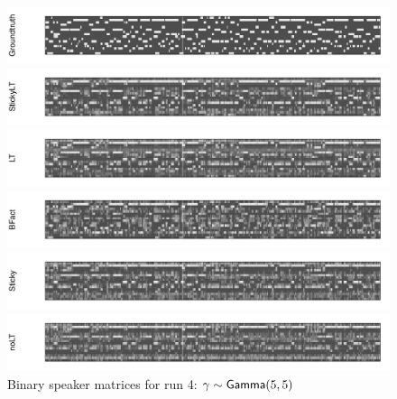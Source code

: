 \begin{figure}[tb]
\begin{center}
  \centerline{\includegraphics[width = \textwidth, height = 0.2\textwidth]{fig/cocktail/synth_s16_m12/hyper_gamma/h10.0_nocs_cp0/a5b5/groundtruth.pdf}}
  \centerline{\includegraphics[width = \textwidth, height = 0.2\textwidth]{fig/cocktail/synth_s16_m12/hyper_gamma/h10.0_nocs_cp0/a5b5/StickyLT_hdp_hmm_w0_agamma5_bgamma5/binary_state.pdf}}
  \centerline{\includegraphics[width = \textwidth, height = 0.2\textwidth]{fig/cocktail/synth_s16_m12/hyper_gamma/h10.0_nocs_cp0/a5b5/LT_hdp_hmm_w0_agamma5_bgamma5/binary_state.pdf}}
  \centerline{\includegraphics[width = \textwidth, height = 0.2\textwidth]{fig/cocktail/synth_s16_m12/hyper_gamma/h10.0_nocs_cp0/a5b5/BFact_hmm_w0_agamma5_bgamma5/binary_state.pdf}}
  \centerline{\includegraphics[width = \textwidth, height = 0.2\textwidth]{fig/cocktail/synth_s16_m12/hyper_gamma/h10.0_nocs_cp0/a5b5/Sticky_hdp_hmm_w0_agamma5_bgamma5/binary_state.pdf}}
  \centerline{\includegraphics[width = \textwidth, height = 0.2\textwidth]{fig/cocktail/synth_s16_m12/hyper_gamma/h10.0_nocs_cp0/a5b5/noLT_hdp_hmm_w0_agamma5_bgamma5/binary_state.pdf}}
\caption{Binary speaker matrices for run 4: $\gamma \sim \mathsf{Gamma}(5,5)$}
\end{center}
\end{figure}


